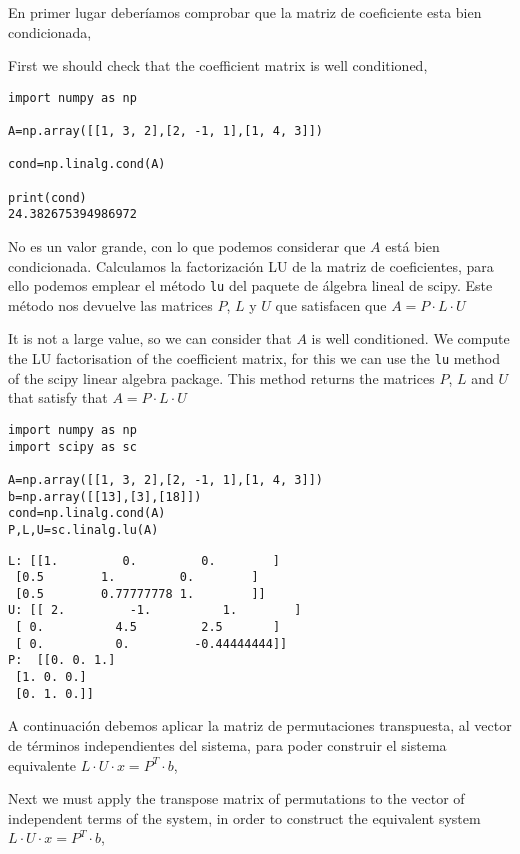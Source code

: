 \begin{paracol}{2}
    
En primer lugar deberíamos comprobar que la matriz de coeficiente esta bien condicionada,


\switchcolumn
First we should check that the coefficient matrix is well conditioned,

\end{paracol}

\begin{verbatim}
import numpy as np

A=np.array([[1, 3, 2],[2, -1, 1],[1, 4, 3]])

cond=np.linalg.cond(A)

print(cond)
24.382675394986972
\end{verbatim}

\begin{paracol}{2}
No es un valor grande, con lo que podemos considerar que $A$ está bien condicionada. 
Calculamos la factorización LU de la matriz de coeficientes, para ello podemos emplear el método \texttt{lu} del paquete de álgebra lineal de scipy. Este método nos devuelve las matrices $P$, $L$ y $U$ que satisfacen que $A=P \cdot L \cdot U$

\switchcolumn
It is not a large value, so we can consider that $A$ is well conditioned. 
We compute the LU factorisation of the coefficient matrix, for this we can use the \texttt{lu} method of the scipy linear algebra package. This method returns the matrices $P$, $L$ and $U$ that satisfy that $A=P \cdot L \cdot U$

\end{paracol}

\begin{verbatim}
import numpy as np
import scipy as sc 

A=np.array([[1, 3, 2],[2, -1, 1],[1, 4, 3]])
b=np.array([[13],[3],[18]])
cond=np.linalg.cond(A)
P,L,U=sc.linalg.lu(A)

\end{verbatim}

\begin{verbatim}
L: [[1.         0.         0.        ]
 [0.5        1.         0.        ]
 [0.5        0.77777778 1.        ]]
U: [[ 2.         -1.          1.        ]
 [ 0.          4.5         2.5       ]
 [ 0.          0.         -0.44444444]]
P:  [[0. 0. 1.]
 [1. 0. 0.]
 [0. 1. 0.]]
\end{verbatim}

\begin{paracol}{2}
A continuación debemos aplicar la matriz de permutaciones transpuesta, al vector de términos independientes del sistema, para poder construir el sistema equivalente $L\cdot U \cdot x=P^T\cdot b$,

\switchcolumn
Next we must apply the transpose matrix of permutations to the vector of independent terms of the system, in order to construct the equivalent system $L\cdot U \cdot x= P^T\cdot b$,

\end{paracol}

